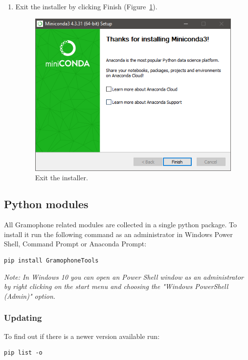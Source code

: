 \documentclass[11pt,a4paper]{article}
\newcommand{\note}[1]{\textit{Note: {#1}}}
\begin{document}
\begin{enumerate}
\item Exit the installer by clicking Finish (Figure~\ref{fig:miniconda_install_done2}).
	\begin{figure}[H]
	\centering
	\includegraphics[scale=0.8]{miniconda_install_done2.PNG}
	\caption{Exit the installer.}
	\label{fig:miniconda_install_done2}
	\end{figure}

\end{enumerate}

\newpage
\subsection{Python modules}
All Gramophone related modules are collected in a single python package. To install it run the following command as an administrator in Windows Power Shell, Command Prompt or Anaconda Prompt:
\begin{verbatim}
pip install GramophoneTools
\end{verbatim}

\note{In Windows 10 you can open an Power Shell window as an administrator by right clicking on the start menu and choosing the "Windows PowerShell (Admin)" option.}

\subsubsection{Updating}
To find out if there is a newer version available run:
\begin{verbatim}
pip list -o
\end{verbatim}
\end{document}
